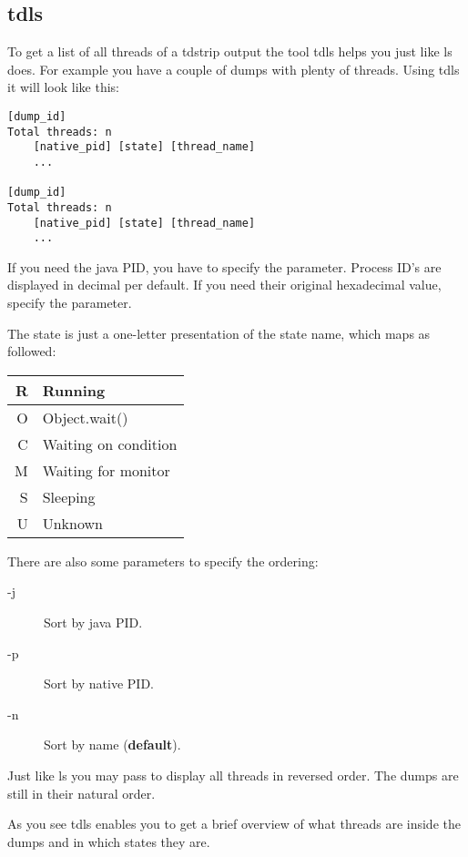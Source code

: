 \subsection{tdls}

To get a list of all threads of a tdstrip output the tool tdls helps you just like ls does.
For example you have a couple of dumps with plenty of threads.
Using tdls it will look like this:
\begin{lstlisting}
[dump_id]
Total threads: n
    [native_pid] [state] [thread_name]
    ...
    
[dump_id]
Total threads: n
    [native_pid] [state] [thread_name]
    ...    
\end{lstlisting}

If you need the java PID, you have to specify the  parameter.
Process ID's are displayed in decimal per default.
If you need their original hexadecimal value, specify the  parameter.

The state is just a one-letter presentation of the state name, which maps as followed:

\begin{tabular}{r | l}
R & Running \\ \hline
O & Object.wait() \\ \hline
C & Waiting on condition \\ \hline
M & Waiting for monitor \\ \hline
S & Sleeping \\ \hline
U & Unknown
\end{tabular}

There are also some parameters to specify the ordering:

\begin{description}
\item[-j] Sort by java PID.
\item[-p] Sort by native PID.
\item[-n] Sort by name (\textbf{default}).
\end{description}

Just like ls you may pass  to display all threads in reversed order.
The dumps are still in their natural order.

As you see tdls enables you to get a brief overview of what threads are inside the dumps and in which states they are.
